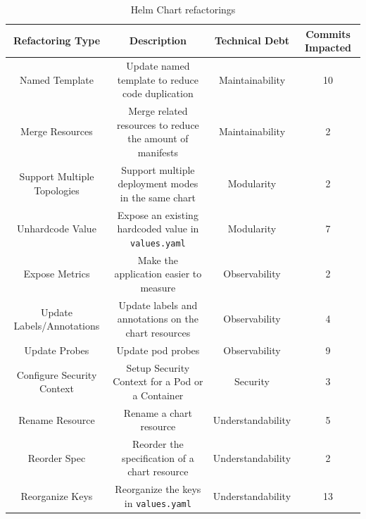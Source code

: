 \documentclass[conference]{IEEEtran}
\begin{document}
\begin{table}
    \centering
    \caption{Helm Chart refactorings}
    \label{tab:refactorings}
    \begin{tabular}{cccc}
        \toprule
        \textbf{Refactoring Type}   & \textbf{Description}                                       & \textbf{Technical Debt} & \textbf{Commits Impacted} \\
        \midrule
        Named Template              & Update named template to reduce code duplication           & Maintainability         & 10                        \\
        Merge Resources             & Merge related resources to reduce the amount of manifests  & Maintainability         & 2                         \\
        Support Multiple Topologies & Support multiple deployment modes in the same chart        & Modularity              & 2                         \\
        Unhardcode Value            & Expose an existing hardcoded value in \texttt{values.yaml} & Modularity              & 7                         \\
        Expose Metrics              & Make the application easier to measure                     & Observability           & 2                         \\
        Update Labels/Annotations   & Update labels and annotations on the chart resources       & Observability           & 4                         \\
        Update Probes               & Update pod probes                                          & Observability           & 9                         \\
        Configure Security Context  & Setup Security Context for a Pod or a Container            & Security                & 3                         \\
        Rename Resource             & Rename a chart resource                                    & Understandability       & 5                         \\
        Reorder Spec                & Reorder the specification of a chart resource              & Understandability       & 2                         \\
        Reorganize Keys             & Reorganize the keys in \texttt{values.yaml}                & Understandability       & 13                        \\
        \bottomrule
    \end{tabular}
\end{table}
\end{document}
